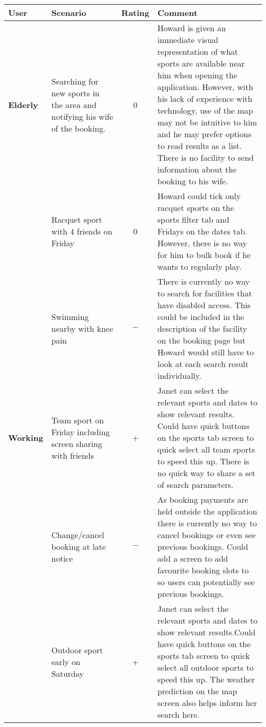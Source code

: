 \begin{center}
	\renewcommand{\arraystretch}{2}
	\begin{longtable}{p{} p{} c p{}}
		\toprule
		\textbf{User} & \textbf{Scenario} & \textbf{Rating} & \textbf{Comment}\\
		\midrule
		\textbf{Elderly} & Searching for new sports in the area and notifying
		his wife of the booking. & 0 & Howard is given an immediate visual
		representation of what sports are available near him when opening the
		application. However, with his lack of experience with technology, use
		of the map may not be intuitive to him and he may prefer options to
		read results as a list. There is no facility to send information about
		the booking to his wife.\\

		& Racquet sport with 4 friends on Friday & 0 & Howard could tick only
		racquet sports on the sports filter tab and Fridays on the dates tab.
		However, there is no way for him to bulk book if he wants to regularly
		play.\\

		& Swimming nearby with knee pain & $-$ & There is currently no way to
		search for facilities that have disabled access. This could be included
		in the description of the facility on the booking page but Howard would
		still have to look at each search result individually.\\

		\midrule
		\textbf{Working} & Team sport on Friday including screen sharing with
		friends& + & Janet can select the relevant sports and dates to show
		relevant results. Could have quick buttons on the sports tab screen to
		quick select all team sports to speed this up. There is no quick way to
		share a set of search parameters.\\

		& Change/cancel booking at late notice & $-$ & As booking payments are
		held outside the application there is currently no way to cancel
		bookings or even see previous bookings. Could add a screen to add
		favourite booking slots to so users can potentially see previous
		bookings.\\

		& Outdoor sport early on Saturday & + & Janet can select the relevant
		sports and dates to show relevant results.Could have quick buttons on
		the sports tab screen to quick select all outdoor sports to speed this
		up. The weather prediction on the map screen also helps inform her
		search here.\\


\end{longtable}
\end{center}

